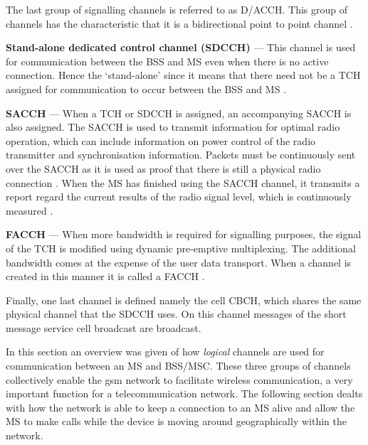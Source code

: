 The last group of signalling channels is referred to as \gls{D/ACCH}. This group of channels has the characteristic that it is a bidirectional point to point channel \cite{GSMArchitectureProtocolsServices}.
\begin{description}
  \item{\textbf{Stand-alone dedicated control channel (\gls{SDCCH})}} --- This channel is used for communication between the \gls{BSS} and \gls{MS} even when there is no active connection\cite{GSMArchitectureProtocolsSerivces}. Hence the `stand-alone' since it means that there need not be a \gls{TCH} assigned for communication to occur between the \gls{BSS} and \gls{MS} \cite{GSMArchitectureProtocolsServices}.
  \item{\textbf{\gls{SACCH}}} --- When a \gls{TCH} or \gls{SDCCH} is assigned, an accompanying \gls{SACCH} is also assigned. The \gls{SACCH} is used to transmit information for optimal radio operation, which can include information on power control of the radio transmitter and synchronisation information\cite{GSMArchitectureProtocolsServices}. Packets must be continuously sent over the \gls{SACCH} as it is used as proof that there is still a physical radio connection \cite{GSMArchitectureProtocolsServices}. When the \gls{MS} has finished using the \gls{SACCH} channel, it transmits a report regard the current results of the radio signal level, which is continuously measured \cite{GSMArchitectureProtocolsServices}.
  \item{\textbf{\gls{FACCH}}} --- When more bandwidth is required for signalling purposes, the signal of the \gls{TCH} is modified using dynamic pre-emptive multiplexing. The additional bandwidth comes at the expense of the user data transport\cite{GSMArchitectureProtocolsServices}. When a channel is created in this manner it is called a \gls{FACCH} \cite{GSMArchitectureProtocolsServices}.
\end{description}

Finally, one last channel is defined namely the cell \gls{CBCH}, which shares the same physical channel that the \gls{SDCCH} uses. On this channel messages of the short message service cell broadcast are broadcast\cite{GSMArchitectureProtocolsServices}.

In this section an overview was given of how \emph{logical} channels are used for communication between an \gls{MS}  and \gls{BSS}/\gls{MSC}\@. These three groups of channels collectively enable the \gls{gsm} network to facilitate wireless communication, a very important function for a telecommunication network. The following section dealts with how the network is able to keep a connection to an \gls{MS} alive and allow the \gls{MS} to make calls while the device is moving around geographically within the network.

